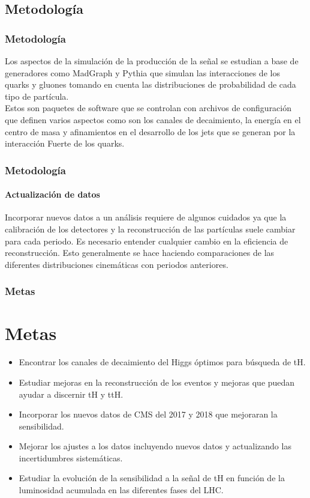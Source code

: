 \documentclass[11pt]{beamer}
\begin{document}
\begin{frame}
\section{Metodolog\'ia}
\frametitle{Metodolog\'ia}
Los aspectos de la simulación de la producción de la señal se estudian a base de
generadores como MadGraph y Pythia que simulan las interacciones de los quarks y
gluones tomando en cuenta las distribuciones de probabilidad de cada tipo de partícula.\\

Estos son paquetes de software que se controlan con archivos de configuración que
definen varios aspectos como son los canales de decaimiento, la energía en el centro de
masa y afinamientos en el desarrollo de los jets que se generan por la interacción Fuerte
de los quarks.
\end{frame}

\begin{frame}
\frametitle{Metodolog\'ia}
\framesubtitle{Actualizaci\'on de datos}
Incorporar nuevos datos a un análisis requiere de algunos cuidados ya que la calibración
de los detectores y la reconstrucción de las partículas suele cambiar para cada periodo.
Es necesario entender cualquier cambio en la eficiencia de reconstrucción. Esto
generalmente se hace haciendo comparaciones de las diferentes distribuciones
cinemáticas con periodos anteriores.

\end{frame}

\begin{frame}
\frametitle{Metas}
\section{Metas}
\begin{itemize}
	\item Encontrar los canales de decaimiento del Higgs óptimos para búsqueda de tH.
	\item Estudiar mejoras en la reconstrucción de los eventos y mejoras que puedan
	ayudar a discernir tH y ttH.
	\item Incorporar los nuevos datos de CMS del 2017 y 2018 que mejoraran la
	sensibilidad.
	\item Mejorar los ajustes a los datos incluyendo nuevos datos y actualizando las
	incertidumbres sistemáticas.
	\item Estudiar la evolución de la sensibilidad a la señal de tH en función de la
	luminosidad acumulada en las diferentes fases del LHC.
\end{itemize}
\end{frame}
\end{document}
